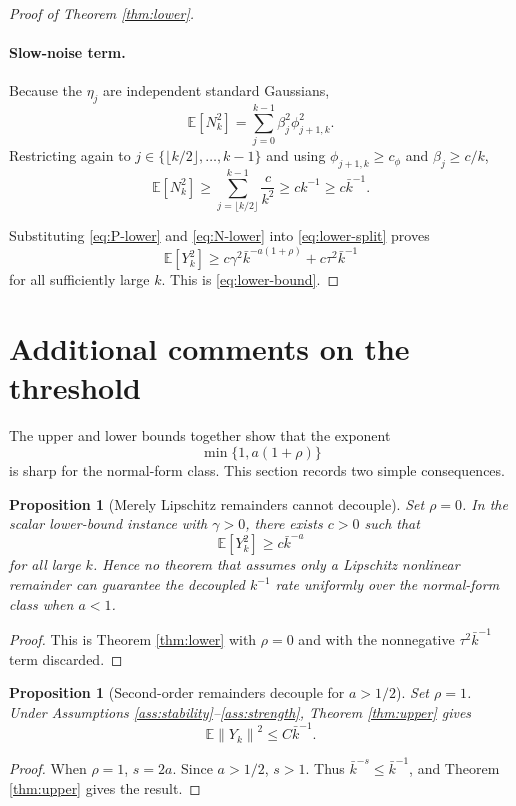 \documentclass{article}
\newtheorem{proposition}[theorem]{Proposition}
\newcommand{\E}{\mathbb{E}}
\newcommand{\norm}[1]{\left\lVert #1\right\rVert}
\begin{document}
\begin{proof}[Proof of Theorem \ref{thm:lower}]
\paragraph{Slow-noise term.}
Because the $\eta_j$ are independent standard Gaussians,
\[
  \E[N_k^2]=\sum_{j=0}^{k-1}\beta_j^2\phi_{j+1,k}^2.
\]
Restricting again to $j\in\{\lfloor k/2\rfloor,\ldots,k-1\}$ and using $\phi_{j+1,k}\ge c_\phi$ and $\beta_j\ge c/k$,
\begin{equation}
  \E[N_k^2]
  \ge \sum_{j=\lfloor k/2\rfloor}^{k-1}\frac{c}{k^2}
  \ge c k^{-1}
  \ge c\bar k^{-1}. \label{eq:N-lower}
\end{equation}

Substituting \eqref{eq:P-lower} and \eqref{eq:N-lower} into \eqref{eq:lower-split} proves
\[
  \E[Y_k^2]\ge c\gamma^2\bar k^{-a(1+\rho)}+c\tau^2\bar k^{-1}
\]
for all sufficiently large $k$. This is \eqref{eq:lower-bound}.
\end{proof}

\section{Additional comments on the threshold}\label{app:threshold}

The upper and lower bounds together show that the exponent
\[
  \min\{1,a(1+\rho)\}
\]
is sharp for the normal-form class. This section records two simple consequences.

\begin{proposition}[Merely Lipschitz remainders cannot decouple]\label{prop:lipschitz}
Set $\rho=0$. In the scalar lower-bound instance with $\gamma>0$, there exists $c>0$ such that
\[
  \E[Y_k^2]\ge c\bar k^{-a}
\]
for all large $k$. Hence no theorem that assumes only a Lipschitz nonlinear remainder can guarantee the decoupled $k^{-1}$ rate uniformly over the normal-form class when $a<1$.
\end{proposition}

\begin{proof}
This is Theorem \ref{thm:lower} with $\rho=0$ and with the nonnegative $\tau^2\bar k^{-1}$ term discarded.
\end{proof}

\begin{proposition}[Second-order remainders decouple for $a>1/2$]\label{prop:second-order}
Set $\rho=1$. Under Assumptions \ref{ass:stability}--\ref{ass:strength}, Theorem \ref{thm:upper} gives
\[
  \E\norm{Y_k}^2\le C\bar k^{-1}.
\]
\end{proposition}

\begin{proof}
When $\rho=1$, $s=2a$. Since $a>1/2$, $s>1$. Thus $\bar k^{-s}\le \bar k^{-1}$, and Theorem \ref{thm:upper} gives the result.
\end{proof}
\end{document}
